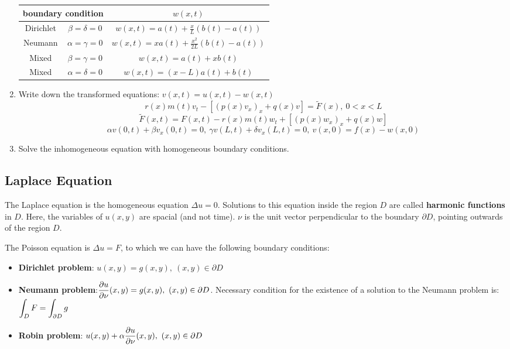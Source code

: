 \documentclass{article}
\begin{document}
\begin{twocolumn}
\begin{enumerate}
	\begin{tabular}{ccc}
		\multicolumn{2}{c}{boundary condition} & $w(x,t)$ \\ \midrule
		Dirichlet & $\beta = \delta = 0$ & $w(x,t) = a(t) + \frac{x}{L} \left(b(t) - a(t)\right)$ \\
		Neumann & $\alpha = \gamma = 0$ & $w(x,t) = x a(t) + \frac{x^2}{2L} \left( b(t) - a(t) \right)$ \\
		Mixed & $\beta = \gamma = 0$ & $w(x,t) = a(t) + xb(t)$ \\
		Mixed & $\alpha = \delta = 0$ & $w(x,t) = (x-L)a(t) + b(t)$ \\
	\end{tabular}
	\item Write down the transformed equations: $v(x,t) = u(x,t) - w(x,t)$
	$$r(x) m(t) v_t - \left[ (p(x) v_x)_x + q(x) v \right] = \tilde F(x), \ 0 < x < L$$
	$$\tilde F(x,t) = F(x,t) - r(x) m(t) w_t + \left[ (p(x)w_x)_x + q(x) w \right]$$
	$$\alpha v(0,t) + \beta v_x(0,t) = 0, \ \gamma v(L,t) + \delta v_x(L,t) = 0, \ v(x,0) = f(x) - w(x,0)$$
	\item Solve the inhomogeneous equation with homogeneous boundary conditions.
\end{enumerate}


\subsection{Laplace Equation}

The Laplace equation is the homogeneous equation $\Delta u = 0$. Solutions to this equation inside the region $D$ are called \textbf{harmonic functions} in $D$. Here, the variables of $u(x,y)$ are spacial (and not time). $\nu$ is the unit vector perpendicular to the boundary $\partial D$, pointing outwards of the region $D$.

The Poisson equation is $\Delta u = F$, to which we can have the following boundary conditions:

\begin{itemize}
	\item \textbf{Dirichlet problem}: $u(x,y) = g(x,y), \ (x,y) \in \partial D$
	\item \textbf{Neumann problem}:$\displaystyle \frac{\partial u}{\partial \nu} (x,y) = g(x,y), \ (x,y) \in \partial D$. Necessary condition for the existence of a solution to the Neumann problem is: $\displaystyle \int_D F = \int_{\partial D} g$
	\item \textbf{Robin problem}: $\displaystyle u(x,y) + \alpha \frac{\partial u}{\partial \nu}(x,y), \ (x,y) \in \partial D$ 
\end{itemize}


\end{twocolumn}
\end{document}
